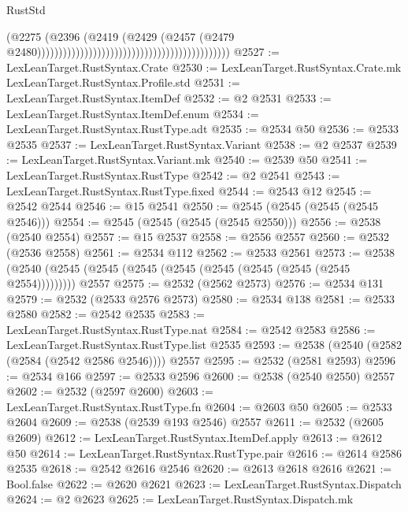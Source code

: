 \begin{lexlean}{RustStd}
\begin{coremodule}
                                                                                  (@2275
                                                                                    (@2396
                                                                                      (@2419
                                                                                        (@2429
                                                                                          (@2457
                                                                                            (@2479
                                                                                              @2480)))))))))))))))))))))))))))))))))))))))))))))
@2527 := LexLeanTarget.RustSyntax.Crate
@2530 := LexLeanTarget.RustSyntax.Crate.mk LexLeanTarget.RustSyntax.Profile.std
@2531 := LexLeanTarget.RustSyntax.ItemDef
@2532 := @2 @2531
@2533 := LexLeanTarget.RustSyntax.ItemDef.enum
@2534 := LexLeanTarget.RustSyntax.RustType.adt
@2535 := @2534 @50
@2536 := @2533 @2535
@2537 := LexLeanTarget.RustSyntax.Variant
@2538 := @2 @2537
@2539 := LexLeanTarget.RustSyntax.Variant.mk
@2540 := @2539 @50
@2541 := LexLeanTarget.RustSyntax.RustType
@2542 := @2 @2541
@2543 := LexLeanTarget.RustSyntax.RustType.fixed
@2544 := @2543 @12
@2545 := @2542 @2544
@2546 := @15 @2541
@2550 := @2545 (@2545 (@2545 (@2545 @2546)))
@2554 := @2545 (@2545 (@2545 (@2545 @2550)))
@2556 := @2538 (@2540 @2554)
@2557 := @15 @2537
@2558 := @2556 @2557
@2560 := @2532 (@2536 @2558)
@2561 := @2534 @112
@2562 := @2533 @2561
@2573 := @2538 (@2540 (@2545 (@2545 (@2545 (@2545 (@2545 (@2545 (@2545 (@2545 @2554))))))))) @2557
@2575 := @2532 (@2562 @2573)
@2576 := @2534 @131
@2579 := @2532 (@2533 @2576 @2573)
@2580 := @2534 @138
@2581 := @2533 @2580
@2582 := @2542 @2535
@2583 := LexLeanTarget.RustSyntax.RustType.nat
@2584 := @2542 @2583
@2586 := LexLeanTarget.RustSyntax.RustType.list @2535
@2593 := @2538 (@2540 (@2582 (@2584 (@2542 @2586 @2546)))) @2557
@2595 := @2532 (@2581 @2593)
@2596 := @2534 @166
@2597 := @2533 @2596
@2600 := @2538 (@2540 @2550) @2557
@2602 := @2532 (@2597 @2600)
@2603 := LexLeanTarget.RustSyntax.RustType.fn
@2604 := @2603 @50
@2605 := @2533 @2604
@2609 := @2538 (@2539 @193 @2546) @2557
@2611 := @2532 (@2605 @2609)
@2612 := LexLeanTarget.RustSyntax.ItemDef.apply
@2613 := @2612 @50
@2614 := LexLeanTarget.RustSyntax.RustType.pair
@2616 := @2614 @2586 @2535
@2618 := @2542 @2616 @2546
@2620 := @2613 @2618 @2616
@2621 := Bool.false
@2622 := @2620 @2621
@2623 := LexLeanTarget.RustSyntax.Dispatch
@2624 := @2 @2623
@2625 := LexLeanTarget.RustSyntax.Dispatch.mk

\end{coremodule}
\end{lexlean}
